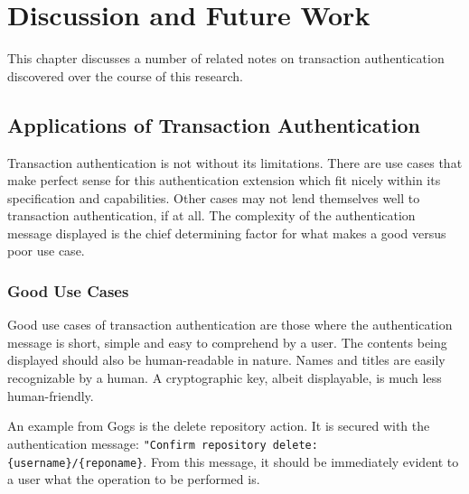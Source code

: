 
\chapter{Discussion and Future Work}\label{Chap:DiscussionAndFutureWork}

This chapter discusses a number of related notes on transaction authentication discovered over the course of this research. 

\section{Applications of Transaction Authentication}

Transaction authentication is not without its limitations. There are use cases that make perfect sense for this authentication extension which fit nicely within its specification and capabilities. Other cases may not lend themselves well to transaction authentication, if at all. The complexity of the authentication message displayed is the chief determining factor for what makes a good versus poor use case.



\subsection{Good Use Cases}

Good use cases of transaction authentication are those where the authentication message is short, simple and easy to comprehend by a user. The contents being displayed should also be human-readable in nature. Names and titles are easily recognizable by a human. A cryptographic key, albeit displayable, is much less human-friendly. 

An example from Gogs is the delete repository action. It is secured with the authentication message: \lstinline|"Confirm repository delete: {username}/{reponame}|. From this message, it should be immediately evident to a user what the operation to be performed is. 

